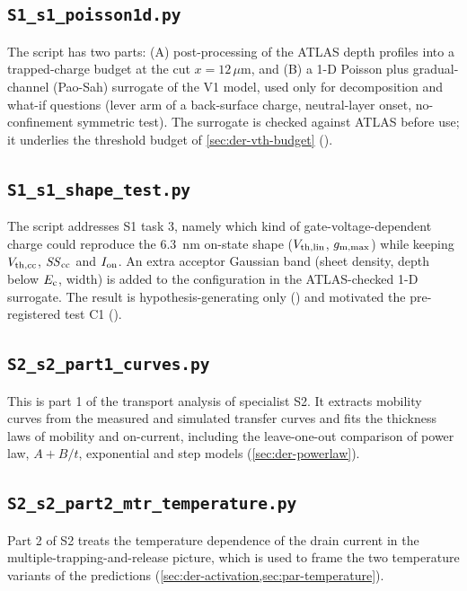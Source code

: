 \subsection{\texttt{S1\_s1\_poisson1d.py}}
The script has two parts: (A) post-processing of the ATLAS depth profiles into a trapped-charge budget at the cut
$x = 12\,\mu$m, and (B) a 1-D Poisson plus gradual-channel (Pao-Sah) surrogate of the V1 model, used only for
decomposition and what-if questions (lever arm of a back-surface charge, neutral-layer onset, no-confinement symmetric
test). The surrogate is checked against ATLAS before use; it underlies the threshold budget of \cref{sec:der-vth-budget}
(\evSURR).


\subsection{\texttt{S1\_s1\_shape\_test.py}}
The script addresses S1 task 3, namely which kind of gate-voltage-dependent charge could reproduce the \SI{6.3}{nm}
on-state shape ($V_{\mathrm{th,lin}}$, $g_{\mathrm{m,max}}$) while keeping $V_{\mathrm{th,cc}}$, $\mathit{SS}_{\mathrm{cc}}$ and $I_{\mathrm{on}}$. An extra acceptor Gaussian band (sheet
density, depth below $E_{\mathrm{c}}$, width) is added to the  configuration in the ATLAS-checked 1-D surrogate. The
result is hypothesis-generating only (\evSURR) and motivated the pre-registered test C1 ().


\subsection{\texttt{S2\_s2\_part1\_curves.py}}
This is part 1 of the transport analysis of specialist S2. It extracts mobility curves from the measured and simulated
transfer curves and fits the thickness laws of mobility and on-current, including the leave-one-out comparison of power
law, $A + B/t$, exponential and step models (\cref{sec:der-powerlaw}).


\subsection{\texttt{S2\_s2\_part2\_mtr\_temperature.py}}
Part 2 of S2 treats the temperature dependence of the drain current in the multiple-trapping-and-release picture, which
is used to frame the two temperature variants of the predictions (\cref{sec:der-activation,sec:par-temperature}).



